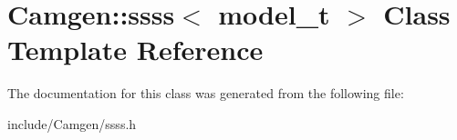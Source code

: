 \hypertarget{a00504}{\section{Camgen\-:\-:ssss$<$ model\-\_\-t $>$ Class Template Reference}
\label{a00504}
}


The documentation for this class was generated from the following file\-:\begin{DoxyCompactItemize}
\item 
include/\-Camgen/ssss.\-h\end{DoxyCompactItemize}
